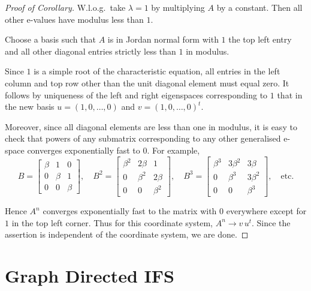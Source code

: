 \documentclass[a4paper]{amsart}
\theoremstyle{plain}
\theoremstyle{definition}
\theoremstyle{remark}
\begin{document}
\begin{proof}[Proof of Corollary] W.l.o.g.\ take $ \lambda=1 $ by multiplying $ A $ by a constant.  Then all other e-values have modulus less than $ 1 $.

Choose a basis such that  $ A $ is in Jordan normal form with  $ 1 $ the top left entry and all other diagonal entries strictly less than $ 1 $ in modulus.  

Since $ 1 $ is a simple root of the characteristic equation, all entries in  the left column and top row other than the unit diagonal element must equal zero.  It follows by uniqueness of the left and right eigenspaces corresponding to $1  $ that in the new basis $ u= (1,0,\dots, 0) $ and $ v= (1,0,\dots, 0)^t $.

Moreover, since all diagonal elements are less than one in modulus,  it is easy to check that powers of any submatrix corresponding to any other generalised e-space converges exponentially fast to $ 0 $.  For example, 
\[
B = \begin{bmatrix} \beta &1 &0 \\ 0 &\beta & 1 \\ 0 & 0 & \beta \end{bmatrix}, \quad
B^2 = \begin{bmatrix} \beta^2 &2 \beta  &1 \\ 0 &\beta^2  & 2 \beta  \\ 0 & 0 & \beta^2 \end{bmatrix}, \quad
B^3 = \begin{bmatrix} \beta^3 &3 \beta^2  &3 \beta  \\ 0 &\beta^3  & 3 \beta^2  \\ 0 & 0 & \beta^3 \end{bmatrix}, 
\quad \text{etc.}
\]

Hence $ A^n $ converges exponentially fast to the matrix with $ 0 $ everywhere except for $ 1 $ in the top left corner.  Thus for  this coordinate system, $ A^n \to v\,   u^t $.   Since the assertion is independent of the coordinate system,  we are done.
\end{proof} 


\section{\textbf{Graph Directed IFS}}   
\end{document}
